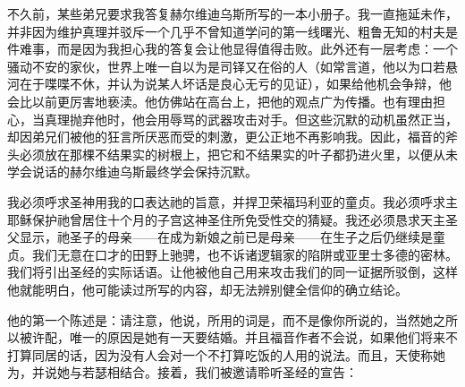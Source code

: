 不久前，某些弟兄要求我答复赫尔维迪乌斯所写的一本小册子。我一直拖延未作，并非因为维护真理并驳斥一个几乎不曾知道学问的第一线曙光、粗鲁无知的村夫是件难事，而是因为我担心我的答复会让他显得值得击败。此外还有一层考虑：一个骚动不安的家伙，世界上唯一自以为是司铎又在俗的人（如常言道，他以为口若悬河在于喋喋不休，并认为说某人坏话是良心无亏的见证），如果给他机会争辩，他会比以前更厉害地亵渎。他仿佛站在高台上，把他的观点广为传播。也有理由担心，当真理抛弃他时，他会用辱骂的武器攻击对手。但这些沉默的动机虽然正当，却因弟兄们被他的狂言所厌恶而受的刺激，更公正地不再影响我。因此，福音的斧头必须放在那棵不结果实的树根上，把它和不结果实的叶子都扔进火里，以便从未学会说话的赫尔维迪乌斯最终学会保持沉默。\par

我必须呼求圣神用我的口表达祂的旨意，并捍卫荣福玛利亚的童贞。我必须呼求主耶稣保护祂曾居住十个月的子宫这神圣住所免受性交的猜疑。我还必须恳求天主圣父显示，祂圣子的母亲——在成为新娘之前已是母亲——在生子之后仍继续是童贞。我们无意在口才的田野上驰骋，也不诉诸逻辑家的陷阱或亚里士多德的密林。我们将引出圣经的实际话语。让他被他自己用来攻击我们的同一证据所驳倒，这样他就能明白，他可能读过所写的内容，却无法辨别健全信仰的确立结论。\par

他的第一个陈述是：请注意，他说，所用的词是，而不是像你所说的，当然她之所以被许配，唯一的原因是她有一天要结婚。并且福音作者不会说，如果他们将来不打算同居的话，因为没有人会对一个不打算吃饭的人用的说法。而且，天使称她为，并说她与若瑟相结合。接着，我们被邀请聆听圣经的宣告：\par

